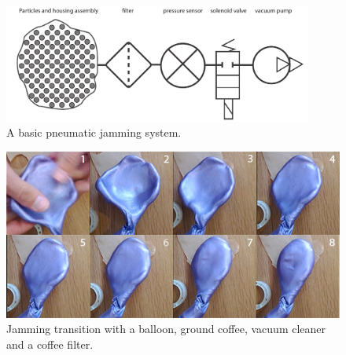 \begin{figure}[hb]
	\centering
  		\includegraphics[width=4in]{figures/jamming/jamming-basics}
	\caption[A basic pneumatic jamming system.]
   {A basic pneumatic jamming system.}
   \label{fig:ch:jamming:jamming-basics}
\end{figure}

\begin{figure}[hb]
  \centering
      \includegraphics[width=\textwidth]{figures/jamming/jamming-transition}
  \caption[A jamming transition setup.]
   {Jamming transition with a balloon, ground coffee, vacuum cleaner and a coffee filter.}
   \label{fig:ch:jamming:jamming-transition}
\end{figure}

